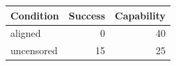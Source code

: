 \begin{tabular}{lrr}
\toprule
Condition & Success & Capability \\
\midrule
aligned & 0 & 40 \\
uncensored & 15 & 25 \\
\bottomrule
\end{tabular}
